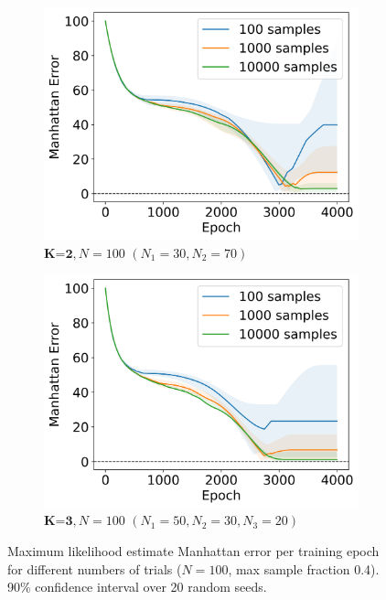 \documentclass{article}
\theoremstyle{plain}
\theoremstyle{definition}
\theoremstyle{remark}
\begin{document}
\begin{figure}[h]
     \centering
     \begin{subfigure}[b]{0.49\textwidth}
         \centering
         \includegraphics[width=\textwidth]{sgd_k2_90ci.png}
         \caption{$\textbf{K=2}, N=100$ $(N_1=30, N_2=70)$}
         \label{fig:appendix_sgd_k=2}
     \end{subfigure}
     \hfill
     \begin{subfigure}[b]{0.49\textwidth}
         \centering
         \includegraphics[width=\textwidth]{sgd_k3_90ci.png}
         \caption{$\textbf{K=3}, N=100$ $(N_1=50, N_2=30, N_3=20)$}
         \label{fig:appendix_sgd_k=3}
     \end{subfigure}
     \caption{Maximum likelihood estimate Manhattan error per training epoch for different numbers of trials ($N=100$, max sample fraction 0.4). 90\% confidence interval over 20 random seeds.}
     \label{fig:appendix_sgd}
\end{figure}
\end{document}
